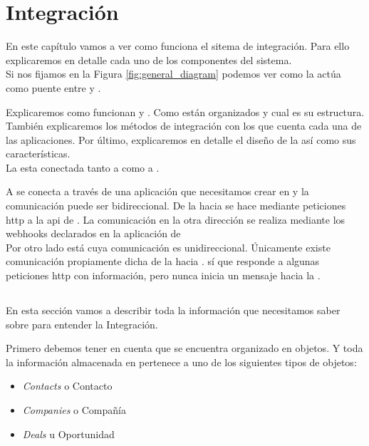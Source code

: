 
\chapter{Integración}

En este capítulo vamos a ver como funciona el sitema de integración. Para ello explicaremos en detalle cada uno de los componentes del sistema.\\

Si nos fijamos en la Figura \ref{fig:general_diagram} podemos ver como la \iface{} actúa como puente entre \hs{} y \wday{}. 



Explicaremos como funcionan \hs{} y \wday{}. Como están organizados y cual es su estructura. También explicaremos los métodos de integración con los que cuenta cada una de las aplicaciones.
Por último, explicaremos en detalle el diseño de la \iface{} así como sus características.\\

La \iface{} esta conectada tanto a \hs{} como a \wday. 

A \hs{} se conecta a través de una aplicación que necesitamos crear en \hs{} y la comunicación  puede ser bidireccional. De la \iface{} hacia \hs{} se hace mediante peticiones \acrshort{http} a la \acrshort{api} de \hs{}. 
La comunicación en la otra dirección se realiza mediante los webhooks declarados en la aplicación de \hs{}\\

Por otro lado está \wday{} cuya comunicación es unidireccional. Únicamente existe comunicación propiamente dicha de la \iface{} hacia \wday. \wday{} sí que responde a algunas peticiones \acrshort{http} con información, pero nunca inicia un mensaje hacia la \iface.

\section{\hs{}}
En esta sección vamos a describir toda la información que necesitamos saber sobre \hs{} para entender la Integración.

Primero debemos tener en cuenta que \hs{} se encuentra organizado en objetos. Y toda la información almacenada en \hs{} pertenece a uno de los siguientes tipos de objetos:

\begin{itemize}
	\item \textit{Contacts} o Contacto
	\item \textit{Companies} o Compañía
	\item \textit{Deals} u Oportunidad
\end{itemize}


